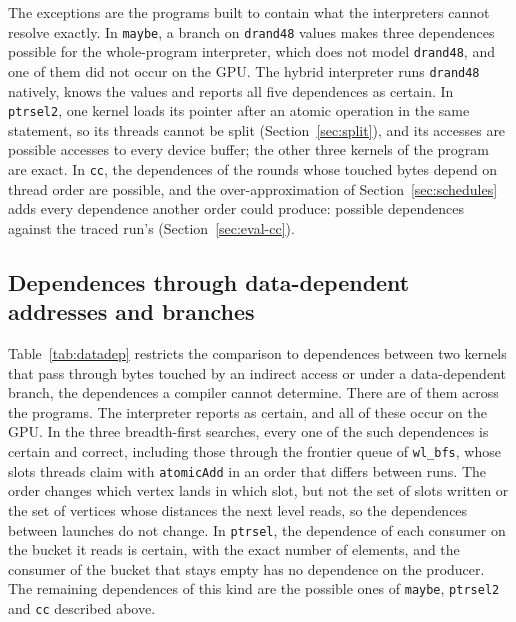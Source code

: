 \documentclass[11pt]{article}
\newcommand{\secref}[1]{Section~\ref{#1}}
\newcommand{\tabref}[1]{Table~\ref{#1}}
\newcommand{\code}[1]{\texttt{#1}}
\begin{document}
The exceptions are the programs built to contain what the interpreters cannot resolve exactly. In \code{maybe}, a
branch on \code{drand48} values makes three dependences possible for the whole-program interpreter, which does not
model \code{drand48}, and one of them did not occur on the GPU. The hybrid interpreter runs \code{drand48} natively,
knows the values and reports all five dependences as certain. In \code{ptrsel2}, one kernel loads its pointer after
an atomic operation in the same statement, so its threads cannot be split (\secref{sec:split}), and its accesses are
possible accesses to every device buffer; the other three kernels of the program are exact. In \code{cc}, the
dependences of the rounds whose touched bytes depend on thread order are possible, and the over-approximation of
\secref{sec:schedules} adds every dependence another order could produce: \numCcPossible{} possible dependences
against the traced run's \numCcTruth{} (\secref{sec:eval-cc}).

\begin{table}[tbp]
\centering
\footnotesize
\setlength{\tabcolsep}{3.5pt}

\caption{Both interpreters against one traced run per program. Cert.\ and Poss.\ count the interpreter's certain and
possible dependences. Certain precision, recall and certain recall are defined in \secref{sec:truth}. The
address-range columns compare, for every operation, buffer, and read or write, the set of units the whole-program
interpreter touched with the GPU's: Exact sets counts how many of these sets are identical, and unit precision and
recall are the shares of the interpreter's units the GPU touched and of the GPU's units the interpreter reported.}
\label{tab:accuracy}
\end{table}

\subsection{Dependences through data-dependent addresses and branches}
\label{sec:eval-data}

\tabref{tab:datadep} restricts the comparison to dependences between two kernels that pass through bytes touched
by an indirect access or under a data-dependent branch, the dependences a compiler cannot determine. There are
\numDataDeps{} of them across the programs. The interpreter reports \numDataMust{} as certain, and all of these
occur on the GPU. In the three breadth-first searches, every one of the \numBfsDeps{} such dependences is
certain and correct, including those through the frontier queue of \code{wl\_bfs}, whose slots threads claim with
\code{atomicAdd} in an order that differs between runs. The order changes which vertex lands in which slot, but
not the set of slots written or the set of vertices whose distances the next level reads, so the dependences
between launches do not change. In \code{ptrsel}, the dependence of each consumer on the bucket it reads is
certain, with the exact number of elements, and the consumer of the bucket that stays empty has no dependence on the
producer. The remaining dependences of this kind are the possible ones of \code{maybe}, \code{ptrsel2} and \code{cc}
described above.
\end{document}
